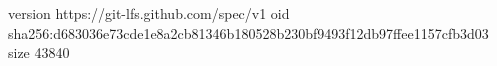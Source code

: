 version https://git-lfs.github.com/spec/v1
oid sha256:d683036e73cde1e8a2cb81346b180528b230bf9493f12db97ffee1157cfb3d03
size 43840
